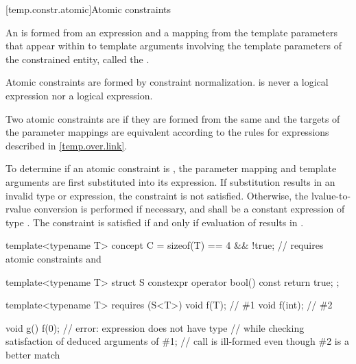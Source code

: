 [temp.constr.atomic]{Atomic constraints}

\pnum
An  is formed from
an expression 
and a mapping from the template parameters
that appear within  to
template arguments involving the
template parameters of the constrained entity,
called the .
\begin{note}
Atomic constraints are formed by constraint normalization.
 is never a logical  expression
nor a logical  expression.
\end{note}

\pnum
Two atomic constraints are
%
if they are formed from the same
and the targets of the parameter mappings are equivalent
according to the rules for expressions described in \ref{temp.over.link}.

\pnum
To determine if an atomic constraint is
,
the parameter mapping and template arguments are
first substituted into its expression.
If substitution results in an invalid type or expression,
the constraint is not satisfied.
Otherwise, the lvalue-to-rvalue conversion
is performed if necessary,
and  shall be a constant expression of type .
The constraint is satisfied if and only if evaluation of 
results in .
\begin{example}
\begin{codeblock}
template<typename T> concept C =
  sizeof(T) == 4 && !true;      // requires atomic constraints  and 

template<typename T> struct S {
  constexpr operator bool() const { return true; }
};

template<typename T> requires (S<T>{})
void f(T);                      // \#1
void f(int);                    // \#2

void g() {
  f(0);                         // error: expression  does not have type 
}                               // while checking satisfaction of deduced arguments of \#1;
                                // call is ill-formed even though \#2 is a better match
\end{codeblock}
\end{example}

